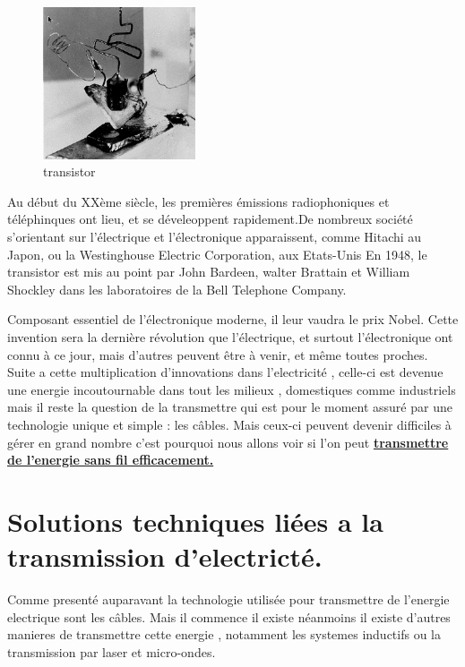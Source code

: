 \documentclass[12pt]{report}
\begin{document}
\begin{figure}
  \begin{center}
    \includegraphics[width=0.4\textwidth]{transistor}
  \end{center}
  \caption{transistor}
\end{figure} Au début du XXème siècle, les premières émissions radiophoniques et téléphinques ont lieu, et se déveleoppent rapidement.De nombreux société s'orientant sur l'électrique et l'électronique apparaissent, comme Hitachi au Japon, ou la Westinghouse Electric Corporation, aux Etats-Unis
En 1948, le transistor est mis au point par John Bardeen, walter Brattain et William Shockley dans les laboratoires de la Bell Telephone Company. 

Composant essentiel de l'électronique moderne, il leur vaudra le prix Nobel.
Cette invention sera la dernière révolution que l'électrique, et surtout l'électronique ont connu à ce jour, mais d'autres peuvent être à venir, et même toutes proches. Suite a cette multiplication d'innovations dans l'electricité , celle-ci est devenue une energie incoutournable dans tout les milieux , domestiques comme industriels mais il reste la question de la transmettre qui est pour le moment assuré par une technologie unique et simple : les câbles. Mais ceux-ci peuvent devenir difficiles à gérer en grand nombre c'est pourquoi nous allons voir si l'on peut \textbf{\underline{transmettre de l'energie sans fil efficacement.}}

\chapter{Solutions techniques liées a la transmission d'electricté.}
  Comme presenté auparavant la technologie utilisée pour transmettre de l'energie electrique sont les câbles. Mais il commence il existe néanmoins il existe d'autres manieres de transmettre cette energie , notamment les systemes inductifs ou la transmission par laser et micro-ondes.
  
\end{document}
